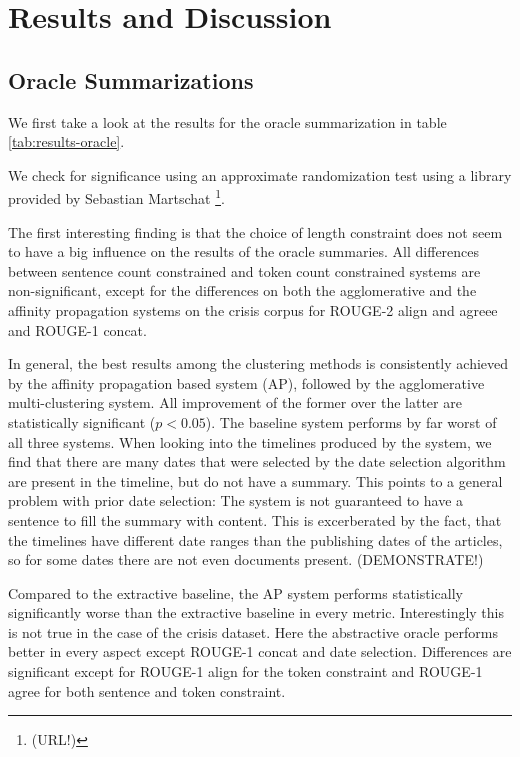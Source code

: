 \documentclass[a4paper,BCOR=10mm]{report}
\numberwithin{lemma}{chapter}
\numberwithin{definition}{chapter}
\begin{document}
\section{Results and Discussion}

\subsection{Oracle Summarizations}

We first take a look at the results for the oracle summarization in table \ref{tab:results-oracle}.

We check for significance using an approximate randomization test \citet{art} using a library provided by Sebastian Martschat \footnote{(URL!)}. %

The first interesting finding is that the choice of length constraint does not seem to have a big influence on the results of the oracle summaries.
All differences between sentence count constrained and token count constrained systems are non-significant, except for the differences on both the agglomerative and the affinity propagation systems on the crisis corpus for ROUGE-2 align and agreee and ROUGE-1 concat.

In general, the best results among the clustering methods is consistently achieved by the affinity propagation based system (AP), followed by the agglomerative multi-clustering system. All improvement of the former over the latter are statistically significant ($p < 0.05$). The baseline system performs by far worst of all three systems. When looking into the timelines produced by the system, we find that there are many dates that were selected by the date selection algorithm are present in the timeline, but do not have a summary. This points to a general problem with prior date selection: The system is not guaranteed to have a sentence to fill the summary with content. This is excerberated by the fact, that the timelines have different date ranges than the publishing dates of the articles, so for some dates there are not even documents present. (DEMONSTRATE!)

Compared to the extractive baseline, the AP system performs statistically significantly worse than the extractive baseline in every metric.
Interestingly this is not true in the case of the crisis dataset. Here the abstractive oracle performs better in every aspect except ROUGE-1 concat and date selection. Differences are significant except for ROUGE-1 align for the token constraint and ROUGE-1 agree for both sentence and token constraint.
\end{document}
